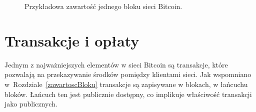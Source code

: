 \documentclass[12pt, oneside, final, openany]{mgr}
\begin{document}
\begin{figure}[H]
	\begin{center}	
	\end{center}
	\caption{Przykładowa zawartość jednego bloku sieci Bitcoin.}
	\label{fig:przykladowyBlok}
\end{figure}
\section{Transakcje i opłaty}
\label{transakcje}

\indent Jednym z najważniejszych elementów w sieci Bitcoin są transakcje, które pozwalają na przekazywanie środków pomiędzy klientami sieci. Jak wspomniano w~Rozdziale~\ref{zawartoscBloku} transakcje są zapisywane w blokach, w łańcuchu bloków. Łańcuch ten jest publicznie dostępny, co implikuje właściwość transakcji jako publicznych. 
\end{document}
